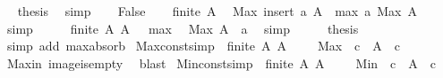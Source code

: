 \begin{isabellebody}
\ \isamarkupfalse%
\ {\isacharquery}{\kern0pt}thesis\ \isamarkupfalse%
\ simp\isanewline
{}\isamarkupfalse%
\isanewline
\ \ \isamarkupfalse%
\ False\isanewline
\ \ \isamarkupfalse%
\ {\isacartoucheopen}finite\ A{\isacartoucheclose}\ \isamarkupfalse%
\ {\isachardoublequoteopen}Max\ {\isacharparenleft}{\kern0pt}insert\ a\ A{\isacharparenright}{\kern0pt}\ {\isacharequal}{\kern0pt}\ max\ a\ {\isacharparenleft}{\kern0pt}Max\ A{\isacharparenright}{\kern0pt}{\isachardoublequoteclose}\isanewline
\ \ \ \ \isamarkupfalse%
\ simp\isanewline
\ \ \isamarkupfalse%
\ \isamarkupfalse%
\ {\isacartoucheopen}finite\ A{\isacartoucheclose}\ {\isacartoucheopen}A\ {\isasymnoteq}\ {\isacharbraceleft}{\kern0pt}{\isacharbraceright}{\kern0pt}{\isacartoucheclose}\ max\ \isamarkupfalse%
\ {\isachardoublequoteopen}Max\ A\ {\isasymle}\ a{\isachardoublequoteclose}\ \isamarkupfalse%
\ simp\isanewline
\ \ \isamarkupfalse%
\ \isamarkupfalse%
\ {\isacharquery}{\kern0pt}thesis\ \isamarkupfalse%
\ {\isacharparenleft}{\kern0pt}simp\ add{\isacharcolon}{\kern0pt}\ max{\isachardot}{\kern0pt}absorb{}{\isacharparenright}{\kern0pt}\isanewline
{}\isamarkupfalse%
%
\endisatagproof
{\isafoldproof}%
%
\isadelimproof
\isanewline
%
\endisadelimproof
\isanewline
{}\isamarkupfalse%
\ Max{\isacharunderscore}{\kern0pt}const{\isacharbrackleft}{\kern0pt}simp{\isacharbrackright}{\kern0pt}{\isacharcolon}{\kern0pt}\ {\isachardoublequoteopen}{\isasymlbrakk}\ finite\ A{\isacharsemicolon}{\kern0pt}\ A\ {\isasymnoteq}\ {\isacharbraceleft}{\kern0pt}{\isacharbraceright}{\kern0pt}\ {\isasymrbrakk}\ {\isasymLongrightarrow}\ Max\ {\isacharparenleft}{\kern0pt}{\isacharparenleft}{\kern0pt}{\isasymlambda}{\isacharunderscore}{\kern0pt}{\isachardot}{\kern0pt}\ c{\isacharparenright}{\kern0pt}\ {\isacharbackquote}{\kern0pt}\ A{\isacharparenright}{\kern0pt}\ {\isacharequal}{\kern0pt}\ c{\isachardoublequoteclose}\isanewline
%
\isadelimproof
%
\endisadelimproof
%
\isatagproof
{}\isamarkupfalse%
\ Max{\isacharunderscore}{\kern0pt}in\ image{\isacharunderscore}{\kern0pt}is{\isacharunderscore}{\kern0pt}empty\ \isamarkupfalse%
\ blast%
\endisatagproof
{\isafoldproof}%
%
\isadelimproof
\isanewline
%
\endisadelimproof
\isanewline
{}\isamarkupfalse%
\ Min{\isacharunderscore}{\kern0pt}const{\isacharbrackleft}{\kern0pt}simp{\isacharbrackright}{\kern0pt}{\isacharcolon}{\kern0pt}\ {\isachardoublequoteopen}{\isasymlbrakk}\ finite\ A{\isacharsemicolon}{\kern0pt}\ A\ {\isasymnoteq}\ {\isacharbraceleft}{\kern0pt}{\isacharbraceright}{\kern0pt}\ {\isasymrbrakk}\ {\isasymLongrightarrow}\ Min\ {\isacharparenleft}{\kern0pt}{\isacharparenleft}{\kern0pt}{\isasymlambda}{\isacharunderscore}{\kern0pt}{\isachardot}{\kern0pt}\ c{\isacharparenright}{\kern0pt}\ {\isacharbackquote}{\kern0pt}\ A{\isacharparenright}{\kern0pt}\ {\isacharequal}{\kern0pt}\ c{\isachardoublequoteclose}\isanewline

\end{isabellebody}
